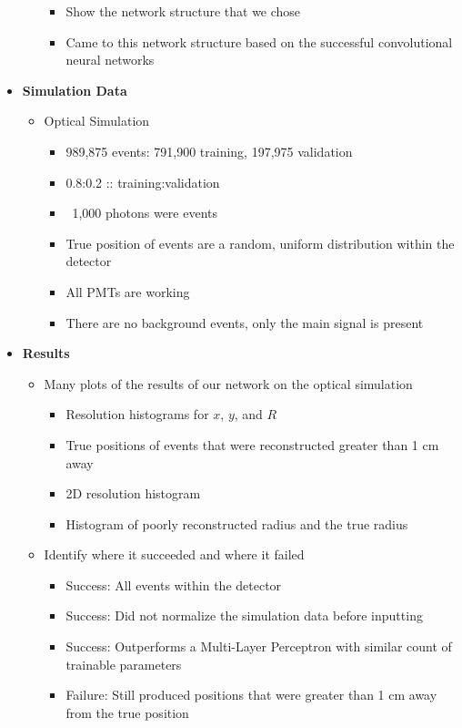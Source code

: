 \documentclass[12pt]{article}
\begin{document}
\begin{itemize}
\begin{itemize}
\begin{itemize}
						\item Show the network structure that we chose
						\item Came to this network structure based on the successful convolutional neural networks
					\end{itemize}
			\end{itemize}
		\item \textbf{Simulation Data}
			\begin{itemize}
				\item Optical Simulation
					\begin{itemize}
						\item 989,875 events: 791,900 training, 197,975 validation
						\item 0.8:0.2 :: training:validation
						\item ~1,000 photons were events
						\item True position of events are a random, uniform distribution within the detector
						\item All PMTs are working
						\item There are no background events, only the main signal is present
					\end{itemize}
			\end{itemize}
		\item \textbf{Results}
			\begin{itemize}
				\item Many plots of the results of our network on the optical simulation
					\begin{itemize}
						\item Resolution histograms for $x$, $y$, and $R$
						\item True positions of events that were reconstructed greater than 1 cm away
						\item 2D resolution histogram
						\item Histogram of poorly reconstructed radius and the true radius
					\end{itemize}
				\item Identify where it succeeded and where it failed
					\begin{itemize}
						\item Success: All events within the detector
						\item Success: Did not normalize the simulation data before inputting
						\item Success: Outperforms a Multi-Layer Perceptron with similar count of trainable parameters
						\item Failure: Still produced positions that were greater than 1 cm away from the true position

\end{itemize}
\end{itemize}
\end{itemize}
\end{document}
